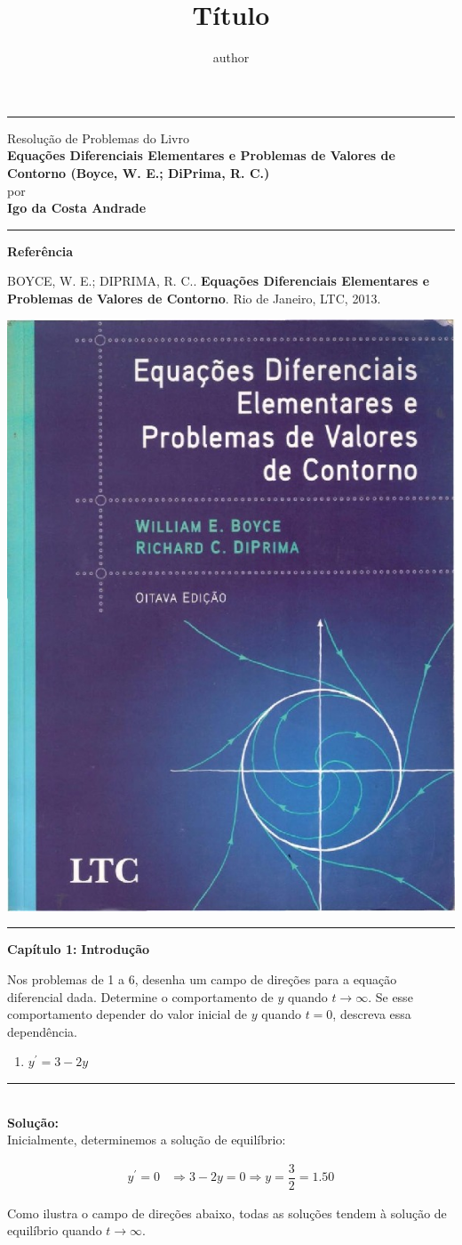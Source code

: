 \documentclass[twoside]{article}
\title{Título}
\author{author}
\newcommand{\iniSol}{
    \noindent\textcolor{mainColor}{\rule{0.3\textwidth}{0.4pt}}\\
    \noindent\textcolor{mainColor}{\textbf{Solução:}}\\
}
\newcommand{\makeheader}{
  \textcolor{mainColor}{\hrule}
  \vspace{0.25cm}
  \begin{minipage}[c]{12cm}
    \begin{center}
      Resolução de Problemas do Livro\\
      \vspace{0.25cm}
      \textcolor{mainColor}{\large{\textbf{Equações Diferenciais Elementares e Problemas de Valores de Contorno (Boyce, W. E.; DiPrima, R. C.)}}}\\
      \vspace{0.7cm}
      \small{por}\\
      \vspace{0.2cm}
      \textbf{\large{Igo da Costa Andrade}}
    \end{center}
    \vspace{0.25cm}
    \hrule
    \vspace{0.25cm}
    \textbf{Referência}
  
    \uppercase{Boyce, W. E.; DiPrima, R. C.}. \textbf{Equações Diferenciais Elementares e Problemas de Valores de Contorno}. Rio de Janeiro, LTC, 2013.
  \end{minipage}
  \begin{minipage}[c]{4cm}
    \begin{flushright}
      \includegraphics[width=0.8\linewidth]{figure/capa.jpg}    
    \end{flushright}
  \end{minipage}
  \vspace{0.25cm}
  \textcolor{mainColor}{\hrule}
  
  \begin{center}
    \vspace{0.5cm}
        \large{\textbf{Capítulo 1: }}
            \large{\textbf{Introdução}}
        \vspace{0.5cm}
  \end{center}
}
\begin{document}
\thispagestyle{empty}

\makeheader


\noindent Nos problemas de 1 a 6, desenha um campo de direções para a equação diferencial dada. Determine o comportamento de \(y\) quando \(t \rightarrow \infty\). Se esse comportamento depender do valor inicial de \(y\) quando \(t = 0\), descreva essa dependência.

\begin{enumerate}
    \item $y^\prime = 3 - 2y$
\end{enumerate}

\iniSol

Inicialmente, determinemos a solução de equilíbrio:

\begin{align*}
    y^\prime = 0 &\Rightarrow 3 - 2y = 0 \Rightarrow y = \dfrac{3}{2} = 1.50
\end{align*}

Como ilustra o campo de direções abaixo, todas as soluções tendem à solução de equilíbrio quando \(t\rightarrow \infty\).
\end{document}

